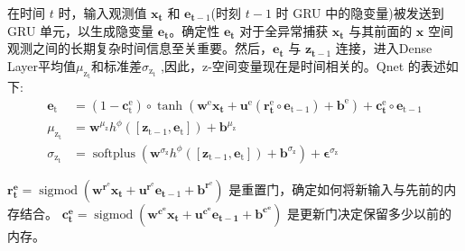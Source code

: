 在时间 $t$ 时，输入观测值 $\mathbf{x}_{\mathbf{t}}$  和 $\mathbf{e}_{\mathbf{t}-1}$(时刻 $t-1$ 时 GRU 中的隐变量)被发送到 GRU 单元，以生成隐变量 $\mathbf{e}_{\mathbf{t}}$。确定性 $\mathbf{e}_{\mathbf{t}}$ 对于全异常捕获  $\mathbf{x}_{\mathbf{t}}$ 与其前面的 $\mathbf{x}$ 空间观测之间的长期复杂时间信息至关重要。然后，$\mathbf{e}_{\mathbf{t}}$ 与 $\mathbf{z}_{\mathbf{t}-1}$ 连接，进入Dense Layer平均值$\mu_{\mathrm{z}_{\mathrm{t}}}$和标准差$\sigma_{\mathrm{z}_{\mathrm{t}}}$ ,因此，z-空间变量现在是时间相关的。Qnet 的表述如下:
\begin{equation}
    \begin{aligned}
    \mathbf{e}_{\mathrm{t}} & =\left(1-\mathbf{c}_{\mathrm{t}}^{\mathrm{e}}\right) \circ \tanh \left(\mathbf{w}^{\mathrm{e}} \mathbf{x}_{\mathbf{t}}+\mathbf{u}^{\mathrm{e}}\left(\mathbf{r}_{\mathbf{t}}^{\mathrm{e}} \circ \mathbf{e}_{\mathrm{t}-1}\right)+\mathbf{b}^{\mathrm{e}}\right)+\mathbf{c}_{\mathbf{t}}^{\mathrm{e}} \circ \mathbf{e}_{\mathrm{t}-1} \\
    \mu_{\mathrm{z}_{\mathrm{t}}} & =\mathbf{w}^{\mu_{\mathrm{z}}} h^\phi\left(\left[\mathbf{z}_{\mathrm{t}-1}, \mathbf{e}_{\mathrm{t}}\right]\right)+\mathbf{b}^{\mu_{\mathrm{z}}} \\
    \sigma_{\mathrm{z}_{\mathrm{t}}} & =\operatorname{softplus}\left(\mathbf{w}^{\sigma_{\mathrm{z}}} h^\phi\left(\left[\mathbf{z}_{\mathrm{t}-1}, \mathbf{e}_{\mathrm{t}}\right]\right)+\mathbf{b}^{\sigma_{\mathrm{z}}}\right)+\boldsymbol{\epsilon}^{\sigma_{\mathrm{z}}}
    \end{aligned}
    \end{equation}

$\mathbf{r}_{\mathbf{t}}^{\mathbf{e}}=\operatorname{sigmod}\left(\mathbf{w}^{\mathbf{r}^{\mathrm{e}}} \mathbf{x}_{\mathbf{t}}+\mathbf{u}^{\mathbf{r}^{\mathrm{e}}} \mathbf{e}_{\mathbf{t}-1}+\mathbf{b}^{\mathbf{r}^{\mathrm{e}}}\right)$ 是重置门，确定如何将新输入与先前的内存结合。 $\mathbf{c}_{\mathbf{t}}^{\mathbf{e}}=\operatorname{sigmod}\left(\mathbf{w}^{\mathbf{c}^{\mathbf{e}}} \mathbf{x}_{\mathbf{t}}+\mathbf{u}^{\mathbf{c}^{\mathbf{e}}} \mathbf{e}_{\mathbf{t}-\mathbf{1}}+\mathbf{b}^{\mathbf{c}^{\mathbf{e}}}\right)$ 是更新门决定保留多少以前的内存。

